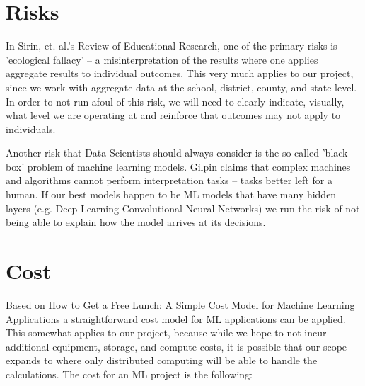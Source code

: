 \documentclass[sigconf,nonacm,11pt]{acmart}
\begin{document}
\section{Risks}
In Sirin, et. al.'s Review of Educational Research, one of the primary risks is 'ecological fallacy' \cite{sirin} -- a misinterpretation of the results where one applies aggregate results to individual outcomes.  This very much applies to our project, since we work with aggregate data at the school, district, county, and state level.  In order to not run afoul of this risk, we will need to clearly indicate, visually, what level we are operating at and reinforce that outcomes may not apply to individuals.

Another risk that Data Scientists should always consider is the so-called 'black box' problem of machine learning models. Gilpin claims that complex machines and algorithms cannot perform interpretation tasks \cite{gilpin}-- tasks better left for a human.  If our best models happen to be ML models that have many hidden layers (e.g. Deep Learning Convolutional Neural Networks) we run the risk of not being able to explain how the model arrives at its decisions.

\section{Cost}
Based on How to Get a Free Lunch: A Simple Cost Model for Machine Learning Applications a straightforward cost model for ML applications can be applied.  This somewhat applies to our project, because while we hope to not incur additional equipment, storage, and compute costs, it is possible that our scope expands to where only distributed computing will be able to handle the calculations.  The cost for an ML project is the following:\\
\end{document}
